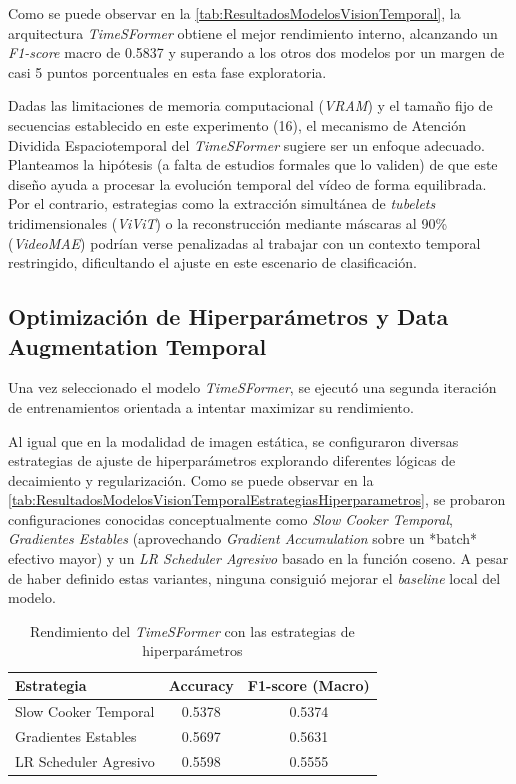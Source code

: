 Como se puede observar en la \autoref{tab:ResultadosModelosVisionTemporal}, la arquitectura \textit{TimeSFormer} obtiene el mejor rendimiento interno, alcanzando un \textit{F1-score} macro de 0.5837 y superando a los otros dos modelos por un margen de casi 5 puntos porcentuales en esta fase exploratoria. 

Dadas las limitaciones de memoria computacional (\textit{VRAM}) y el tamaño fijo de secuencias establecido en este experimento (16), el mecanismo de Atención Dividida Espaciotemporal del \textit{TimeSFormer} sugiere ser un enfoque adecuado. Planteamos la hipótesis (a falta de estudios formales que lo validen) de que este diseño ayuda a procesar la evolución temporal del vídeo de forma equilibrada. Por el contrario, estrategias como la extracción simultánea de \textit{tubelets} tridimensionales (\textit{ViViT}) o la reconstrucción mediante máscaras al 90\% (\textit{VideoMAE}) podrían verse penalizadas al trabajar con un contexto temporal restringido, dificultando el ajuste en este escenario de clasificación.

\subsection{Optimización de Hiperparámetros y Data Augmentation Temporal}
\label{subsec:OptimizacionDeHiperparametrosYDataAugmentationTemporal}

Una vez seleccionado el modelo \textit{TimeSFormer}, se ejecutó una segunda iteración de entrenamientos orientada a intentar maximizar su rendimiento.

Al igual que en la modalidad de imagen estática, se configuraron diversas estrategias de ajuste de hiperparámetros explorando diferentes lógicas de decaimiento y regularización. Como se puede observar en la \autoref{tab:ResultadosModelosVisionTemporalEstrategiasHiperparametros}, se probaron configuraciones conocidas conceptualmente como \textit{Slow Cooker Temporal}, \textit{Gradientes Estables} (aprovechando \textit{Gradient Accumulation} sobre un *batch* efectivo mayor) y un \textit{LR Scheduler Agresivo} basado en la función coseno. A pesar de haber definido estas variantes, ninguna consiguió mejorar el \textit{baseline} local del modelo.

\begin{table}[H]
    \centering
    \begin{tabular}{lcc}
        \toprule
        \textbf{Estrategia} & \textbf{Accuracy} & \textbf{F1-score (Macro)} \\
        \midrule 
            Slow Cooker Temporal  & 0.5378 & 0.5374 \\
            Gradientes Estables   & 0.5697 & 0.5631 \\
            LR Scheduler Agresivo   & 0.5598 & 0.5555 \\
        \bottomrule
    \end{tabular}
    \caption{Rendimiento del \textit{TimeSFormer} con las estrategias de hiperparámetros}
    \label{tab:ResultadosModelosVisionTemporalEstrategiasHiperparametros}
\end{table}

